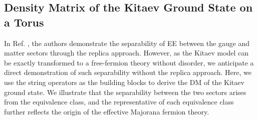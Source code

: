\subsection{Density Matrix of the Kitaev Ground State on a Torus}\label{sec:density-matrix-calculate}

In Ref. \cite{Yao-Qi_2010}, the authors demonstrate the separability of EE between the gauge and matter sectors through the replica approach. However, as the Kitaev model can be exactly transformed to a free-fermion theory without disorder, we anticipate a direct demonstration of such separability without the replica approach. Here, we use the string operators as the building blocks to derive the DM of the Kitaev ground state. We illustrate that the separability between the two sectors arises from the equivalence class, and the representative of each equivalence class further reflects the origin of the effective Majorana fermion theory.

